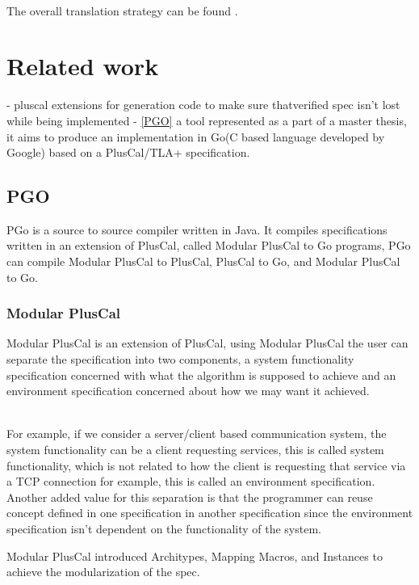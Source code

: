 \documentclass{thesul}
\begin{document}
\hfill\\
The overall translation strategy can be found \cite{pcalAlgo}.

\chapter{Related work}

- pluscal extensions for generation code to make sure thatverified spec isn't lost while being implemented
- \ref{PGO} a tool represented as a part of a master thesis, it aims to produce an implementation in Go(C based language developed by Google) based on a PlusCal/TLA+ specification.

\section{PGO}

PGo is a source to source compiler written in Java. It compiles specifications written in an extension of PlusCal, called Modular PlusCal to Go programs, PGo can compile Modular PlusCal to PlusCal, PlusCal to Go, and Modular PlusCal to Go.

\subsection{Modular PlusCal}

Modular PlusCal is an extension of PlusCal, using Modular PlusCal the user can separate the specification into two components, a system functionality specification concerned with what the algorithm is supposed to achieve and an environment specification concerned about how we may want it achieved.

\hfill\\

For example, if we consider a server/client based communication system, the system functionality can be a client requesting services, this is called system functionality, which is not related to how the client is requesting that service via a TCP connection for example, this is called an environment specification. Another added value for this separation is that the programmer can reuse concept defined in one specification in another specification since the environment specification isn't dependent on the functionality of the system.

Modular PlusCal introduced Architypes, Mapping Macros, and Instances to achieve the modularization of the spec.
\end{document}
